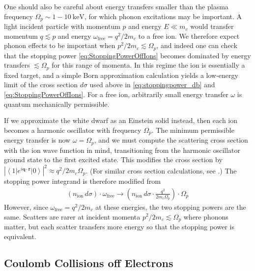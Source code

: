 \documentclass[twocolumn,preprintnumbers,amsmath,amssymb,prd, superscriptaddress]{revtex4} %
\newcommand{\ket}[1]{\ensuremath{\left|#1\right>}}
\newcommand{\bra}[1]{\ensuremath{\left<#1\right|}}
\begin{document}
\begin{appendices}
One should also be careful about energy transfers smaller than the plasma frequency $\Omega_p \sim 1-10~\text{keV}$, for which phonon excitations may be important. A light incident particle with momentum $p$ and energy $E\ll m_c$ would transfer momentum $q\lesssim p$ and energy $\omega_\text{free} = q^2/2 m_c$ to a free ion. We therefore expect phonon effects to be important when $p^2/2 m_c \lesssim \Omega_p$, and indeed one can check that the stopping power \eqref{eq:StoppingPowerOffIons} becomes dominated by energy transfers $\lesssim \Omega_p$ for this range of momenta. In this regime the ion is essentially a fixed target, and a simple Born approximation calculation yields a low-energy limit of the cross section $d \sigma$ used above in \eqref{eq:stoppingpower_db} and \eqref{eq:StoppingPowerOffIons}. For a free ion, arbitrarily small energy transfer $\omega$ is quantum mechanically permissible.

If we approximate the white dwarf as an Einstein solid instead, then each ion becomes a harmonic oscillator with frequency $\Omega_p$. The minimum permissible energy transfer is now $\omega = \Omega_p$, and we must compute the scattering cross section with the ion wave function in mind, transitioning from the harmonic oscillator ground state to the first excited state. This modifies the cross section by $|\bra{1}e^{i\textbf{q}\cdot \textbf{r}}\ket{0}|^2\approx q^2/2 m_c\Omega_p$. (For similar cross section calculations, see \cite{Hofstadter}.) The stopping power integrand is therefore modified from
\begin{align}
(n_\text{ion}\, d\sigma)\cdot\omega_\text{free} \to (n_\text{ion}\, d\sigma\cdot\frac{q^2}{2 m_c\Omega_p})\cdot \Omega_p
\end{align}
However, since $\omega_\text{free} = q^2/2 m_c$ at these energies, the two stopping powers are the same. Scatters are rarer at incident momenta $p^2/2 m_c \lesssim \Omega_p$ where phonons matter, but each scatter transfers more energy so that the stopping power is equivalent.


\subsection{Coulomb Collisions off Electrons}


\end{appendices}
\end{document}
